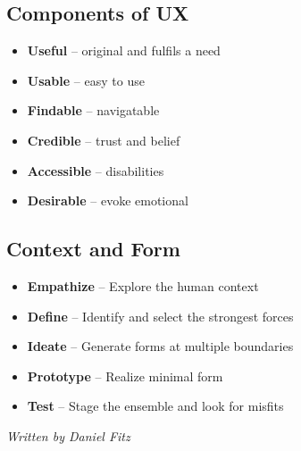 \documentclass[10pt,a4paper]{article}
\begin{document}
\begin{landscape}
\begin{multicols}{3}
\subsection{Components of UX}
\begin{itemize}
    \item \textbf{Useful} -- original and fulfils a need
    \item \textbf{Usable} -- easy to use
    \item \textbf{Findable} -- navigatable
    \item \textbf{Credible} -- trust and belief
    \item \textbf{Accessible} -- disabilities
    \item \textbf{Desirable} -- evoke emotional
\end{itemize}
\subsection{Context and Form}
\begin{itemize}
    \item \textbf{Empathize} -- Explore the human context
    \item \textbf{Define} -- Identify and select the strongest forces
    \item \textbf{Ideate} -- Generate forms at multiple boundaries
    \item \textbf{Prototype} -- Realize minimal form
    \item \textbf{Test} -- Stage the ensemble and look for misfits
\end{itemize}


\vfill\vspace{1em}\textit{Written by Daniel Fitz}
\end{multicols}
\end{landscape}
\end{document}
